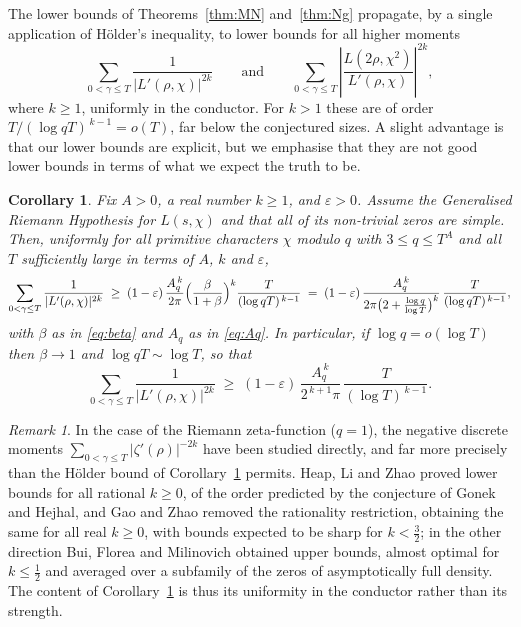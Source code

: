 \documentclass[12pt,a4paper,reqno]{amsart}
\newtheorem{corollary}[theorem]{Corollary}
\theoremstyle{remark}
\newtheorem*{remark}{Remark}
\numberwithin{equation}{section}
\begin{document}
The lower bounds of Theorems~\ref{thm:MN} and~\ref{thm:Ng} propagate, by a
single application of H\"older's inequality, to lower bounds for all higher
moments
\[
  \sum_{0<\gamma\le T}\frac{1}{|L'(\rho,\chi)|^{2k}}
  \qquad\text{and}\qquad
  \sum_{0<\gamma\le T}\left|\frac{L(2\rho,\chi^2)}{L'(\rho,\chi)}\right|^{2k},
\]
where $k \geq 1$, uniformly in the conductor. For $k>1$ these are of order $T/(\log qT)^{\,k-1}=o(T)$, far below the conjectured sizes. A slight advantage is that our lower bounds are explicit, but we emphasise that they are not good lower bounds in terms of what we expect the truth to be.

\begin{corollary}\label{cor:MN-higher}
Fix $A>0$, a real number $k\ge1$, and $\varepsilon>0$. Assume the Generalised
Riemann Hypothesis for $L(s,\chi)$ and that all of its non-trivial zeros are
simple. Then, uniformly for all primitive characters $\chi$ modulo $q$ with
$3\le q\le T^{A}$ and all $T$ sufficiently large in terms of $A$, $k$ and
$\varepsilon$,
\[
  \sum_{0<\gamma\le T}\frac{1}{|L'(\rho,\chi)|^{2k}}
  \;\ge\;(1-\varepsilon)\,\frac{A_q^{\,k}}{2\pi}
  \Bigl(\frac{\beta}{1+\beta}\Bigr)^{k}\frac{T}{(\log qT)^{\,k-1}}
  \;=\;(1-\varepsilon)\,\frac{A_q^{\,k}}{2\pi\bigl(2+\frac{\log q}{\log T}\bigr)^{k}}
  \,\frac{T}{(\log qT)^{\,k-1}},
\]
with $\beta$ as in \eqref{eq:beta} and $A_q$ as in \eqref{eq:Aq}. In particular,
if $\log q=o(\log T)$ then $\beta\to1$ and $\log qT\sim\log T$, so that
\[
  \sum_{0<\gamma\le T}\frac{1}{|L'(\rho,\chi)|^{2k}}
  \;\ge\;(1-\varepsilon)\,\frac{A_q^{\,k}}{2^{\,k+1}\pi}\,\frac{T}{(\log T)^{\,k-1}} .
\]
\end{corollary}

\begin{remark}
In the case of the Riemann zeta-function ($q=1$), the negative discrete moments $\sum_{0<\gamma\le T}|\zeta'(\rho)|^{-2k}$ have been studied directly, and far more precisely than the H\"older bound of Corollary~\ref{cor:MN-higher} permits. Heap, Li and Zhao \cite{HLZ} proved lower bounds for all rational $k\ge0$, of the order predicted by the conjecture of Gonek and Hejhal, and Gao and Zhao \cite{GaoZhao} removed the rationality restriction, obtaining the same for all real $k\ge0$, with bounds expected to be sharp for $k<\tfrac32$; in the other direction Bui, Florea and Milinovich \cite{BFM} obtained upper bounds, almost optimal for $k\le\tfrac12$ and averaged over a subfamily of the zeros of asymptotically full density. The content of Corollary~\ref{cor:MN-higher} is thus its uniformity in the conductor rather than its strength.
\end{remark}
\end{document}

